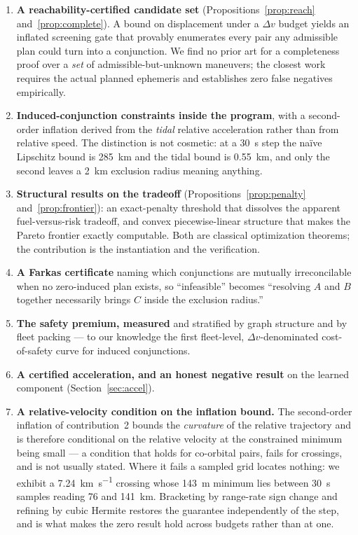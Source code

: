 \documentclass[11pt]{article}
\theoremstyle{definition}
\theoremstyle{remark}
\newcommand{\dv}{\Delta v}
\begin{document}
\begin{enumerate}
\item \textbf{A reachability-certified candidate set} (Propositions~\ref{prop:reach}
and~\ref{prop:complete}). A bound on displacement under a $\dv$ budget yields
an inflated screening gate that provably enumerates every pair any admissible
plan could turn into a conjunction. We find no prior art for a completeness
proof over a \emph{set} of admissible-but-unknown maneuvers; the closest
work~\cite{rivero2025} requires the actual planned ephemeris and establishes
zero false negatives empirically.

\item \textbf{Induced-conjunction constraints inside the program}, with a
second-order inflation derived from the \emph{tidal} relative acceleration
rather than from relative speed. The distinction is not cosmetic: at a
\SI{30}{\second} step the na\"ive Lipschitz bound is \SI{285}{\kilo\meter} and
the tidal bound is \SI{0.55}{\kilo\meter}, and only the second leaves a
\SI{2}{\kilo\meter} exclusion radius meaning anything.

\item \textbf{Structural results on the tradeoff} (Propositions~\ref{prop:penalty}
and~\ref{prop:frontier}): an exact-penalty threshold that dissolves the apparent
fuel-versus-risk tradeoff, and convex piecewise-linear structure that makes the
Pareto frontier exactly computable. Both are classical optimization theorems;
the contribution is the instantiation and the verification.

\item \textbf{A Farkas certificate} naming which conjunctions are mutually
irreconcilable when no zero-induced plan exists, so ``infeasible'' becomes
``resolving $A$ and $B$ together necessarily brings $C$ inside the exclusion
radius.''

\item \textbf{The safety premium, measured} and stratified by graph structure
and by fleet packing --- to our knowledge the first fleet-level, $\dv$-denominated
cost-of-safety curve for induced conjunctions.

\item \textbf{A certified acceleration, and an honest negative result} on the
learned component (Section~\ref{sec:accel}).

\item \textbf{A relative-velocity condition on the inflation bound.} The
second-order inflation of contribution~2 bounds the \emph{curvature} of the
relative trajectory and is therefore conditional on the relative velocity at
the constrained minimum being small --- a condition that holds for co-orbital
pairs, fails for crossings, and is not usually stated. Where it fails a
sampled grid locates nothing: we exhibit a \SI{7.24}{\kilo\meter\per\second}
crossing whose \SI{143}{\meter} minimum lies between \SI{30}{\second} samples
reading \SI{76}{} and \SI{141}{\kilo\meter}. Bracketing by range-rate sign
change and refining by cubic Hermite restores the guarantee independently of
the step, and is what makes the zero result hold across budgets rather than at
one.


\end{enumerate}
\end{document}
